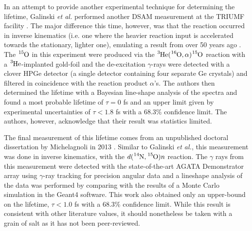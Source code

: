In an attempt to provide another experimental technique for determining the lifetime, Galinski \textit{et al.} performed another DSAM measurement at the TRIUMF facility \cite{Galinski2014}. The major difference this time, however, was that the reaction occurred in inverse kinematics (i.e. one where the heavier reaction input is accelerated towards the stationary, lighter one), emulating a result from over 50 years ago \cite{Gill1968}. The $\ce{^{15}O}$ in this experiment were produced via the $\ce{^{3}He}(\ce{^{16}O},\alpha)\ce{^{15}O}$ reaction with a $\ce{^{3}He}$-implanted gold-foil and the de-excitation $\gamma$-rays were detected with a clover HPGe detector (a single detector containing four separate Ge crystals) and filtered in coincidence with the reaction product $\alpha$'s. The authors then determined the lifetime with a Bayesian line-shape analysis of the spectra and found a most probable lifetime of $\tau = 0$ fs and an upper limit given by experimental uncertainties of $\tau < 1.8$ fs with a 68.3\% confidence limit. The authors, however, acknowledge that their result was statistics limited.

The final measurement of this lifetime comes from an unpublished doctoral dissertation by Michelagnoli in 2013 \cite{Michelagnoli2013}. Similar to Galinski \textit{et al.}, this measurement was done in inverse kinematics, with the $d(\ce{^{14}N},\ce{^{15}O})n$ reaction. The $\gamma$ rays from this measurement were detected with the state-of-the-art AGATA Demonstrator array using $\gamma$-ray tracking for precision angular data and a lineshape analysis of the data was performed by comparing with the results of a Monte Carlo simulation in the Geant4 software. This work also obtained only an upper-bound on the lifetime, $\tau < 1.0$ fs with a 68.3\% confidence limit. While this result is consistent with other literature values, it should nonetheless be taken with a grain of salt as it has not been peer-reviewed. 

